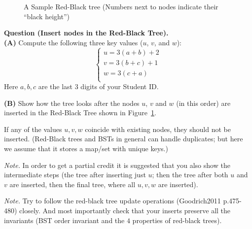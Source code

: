 \documentclass[a4paper,12pt]{article}
\begin{document}
\begin{figure}[!htb]
\caption{\label{fig:original-tree} A Sample Red-Black tree (Numbers next to nodes indicate their ``black height'')}
\end{figure}

\vspace{20pt}
{\bf Question (Insert nodes in the Red-Black Tree).}\\

\vspace{5pt}
{\bf (A)} Compute the following three key values ($u$, $v$, and $w$): 
$$\left\{ \begin{array}{l}
u = 3(a+b)+2\\
v = 3(b+c)+1\\
w = 3(c+a)\\ 
\end{array} \right.$$
Here $a,b,c$ are the last $3$ digits of your Student ID.

\vspace{5pt}
{\bf (B)} Show how the tree looks after the nodes $u$, $v$ and $w$ (in this order)
are inserted in the Red-Black Tree shown in Figure~\ref{fig:original-tree}.

If any of the values $u,v,w$ coincide with existing nodes, they 
should not be inserted. (Red-Black trees and BSTs in general can handle duplicates; but here
we assume that it stores a map/set with unique keys.)

{\em Note.} In order to get a partial credit 
it is suggested that you also show the intermediate steps (the
tree after inserting just $u$; then the tree after both $u$ and $v$ are inserted, 
then the final tree, where all $u,v,w$ are inserted). 

{\em Note.} Try to follow the red-black tree update operations (Goodrich2011 p.475-480) 
closely. And most importantly \textendash{} check that your inserts preserve 
all the invariants (BST order invariant and the $4$ properties of red-black trees).
\end{document}
